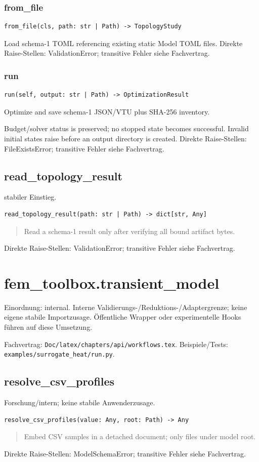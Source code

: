 \subsubsection*{from\_file}
\begin{lstlisting}
from_file(cls, path: str | Path) -> TopologyStudy
\end{lstlisting}
Load schema-1 TOML referencing existing static Model TOML files.
Direkte Raise-Stellen: ValidationError; transitive Fehler siehe Fachvertrag.
\subsubsection*{run}
\begin{lstlisting}
run(self, output: str | Path) -> OptimizationResult
\end{lstlisting}
Optimize and save schema-1 JSON/VTU plus SHA-256 inventory.\par Budget/solver status is preserved; no stopped state becomes successful. Invalid initial states raise before an output directory is created.
Direkte Raise-Stellen: FileExistsError; transitive Fehler siehe Fachvertrag.
\subsection{read\_topology\_result}
stabiler Einstieg.
\begin{lstlisting}
read_topology_result(path: str | Path) -> dict[str, Any]
\end{lstlisting}
\begin{quote}
Read a schema-1 result only after verifying all bound artifact bytes.
\end{quote}
Direkte Raise-Stellen: ValidationError; transitive Fehler siehe Fachvertrag.
\section{fem\_toolbox.transient\_model}
Einordnung: internal. Interne Validierungs-/Reduktions-/Adaptergrenze; keine eigene stabile Importzusage. Öffentliche Wrapper oder experimentelle Hooks führen auf diese Umsetzung.
\par Fachvertrag: \nolinkurl{Doc/latex/chapters/api/workflows.tex}. Beispiele/Tests:
\nolinkurl{examples/surrogate_heat/run.py}.
\subsection{resolve\_csv\_profiles}
Forschung/intern; keine stabile Anwenderzusage.
\begin{lstlisting}
resolve_csv_profiles(value: Any, root: Path) -> Any
\end{lstlisting}
\begin{quote}
Embed CSV samples in a detached document; only files under model root.
\end{quote}
Direkte Raise-Stellen: ModelSchemaError; transitive Fehler siehe Fachvertrag.
